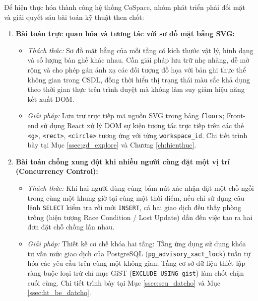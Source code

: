 Để hiện thực hóa thành công hệ thống CoSpace, nhóm phát triển phải đối mặt và giải quyết sáu bài toán kỹ thuật then chốt:

\begin{enumerate}
    \item \textbf{Bài toán trực quan hóa và tương tác với sơ đồ mặt bằng SVG:}
    \begin{itemize}
        \item \textit{Thách thức:} Sơ đồ mặt bằng của mỗi tầng có kích thước vật lý, hình dạng và số lượng bàn ghế khác nhau. Cần giải pháp lưu trữ nhẹ nhàng, dễ mở rộng và cho phép gán ánh xạ các đối tượng đồ họa với bản ghi thực thể không gian trong CSDL, đồng thời hiển thị trạng thái màu sắc khả dụng theo thời gian thực trên trình duyệt mà không làm suy giảm hiệu năng kết xuất DOM.
        \item \textit{Giải pháp:} Lưu trữ trực tiếp mã nguồn SVG trong bảng \texttt{floors}; Front-end sử dụng React xử lý DOM sự kiện tương tác trực tiếp trên các thẻ \texttt{<g>}, \texttt{<rect>}, \texttt{<circle>} tương ứng với từng \texttt{workspace\_id}. Chi tiết trình bày tại Mục \ref{ssec:gd_explore} và Chương \ref{ch:hienthuc}.
    \end{itemize}

    \item \textbf{Bài toán chống xung đột khi nhiều người cùng đặt một vị trí (Concurrency Control):}
    \begin{itemize}
        \item \textit{Thách thức:} Khi hai người dùng cùng bấm nút xác nhận đặt một chỗ ngồi trong cùng một khung giờ tại cùng một thời điểm, nếu chỉ sử dụng câu lệnh \texttt{SELECT} kiểm tra rồi mới \texttt{INSERT}, cả hai giao dịch đều thấy phòng trống (hiện tượng Race Condition / Lost Update) dẫn đến việc tạo ra hai đơn đặt chỗ chồng lấn nhau.
        \item \textit{Giải pháp:} Thiết kế cơ chế khóa hai tầng: Tầng ứng dụng sử dụng khóa tư vấn mức giao dịch của PostgreSQL (\texttt{pg\_advisory\_xact\_lock}) tuần tự hóa các yêu cầu trên cùng một không gian; Tầng cơ sở dữ liệu thiết lập ràng buộc loại trừ chỉ mục GiST (\texttt{EXCLUDE USING gist}) làm chốt chặn cuối cùng. Chi tiết trình bày tại Mục \ref{ssec:seq_datcho} và Mục \ref{ssec:ht_be_datcho}.
    \end{itemize}


\end{enumerate}
